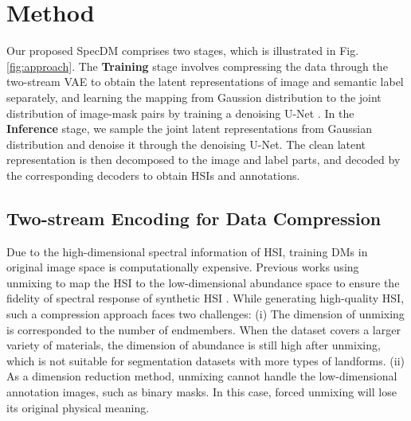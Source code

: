 \section{Method}
\label{sec:method}

Our proposed SpecDM comprises two stages, which is illustrated in Fig. \ref{fig:approach}. The \textbf{Training} stage involves compressing the data through the two-stream VAE to obtain the latent representations of image and semantic label separately, and learning the mapping from Gaussion distribution to the joint distribution of image-mask pairs by training a denoising U-Net \cite{unet}. In the \textbf{Inference} stage, we sample the joint latent representations from Gaussian distribution and denoise it through the denoising U-Net. The clean latent representation is then decomposed to the image and label parts, and decoded by the corresponding decoders to obtain HSIs and annotations.

\subsection{Two-stream Encoding for Data Compression}

Due to the high-dimensional spectral information of HSI, training DMs in original image space is computationally expensive. Previous works using unmixing to map the HSI to the low-dimensional abundance space to ensure the fidelity of spectral response of synthetic HSI \cite{yu2024unmixdiff, yu2024unmixing}. While generating high-quality HSI, such a compression approach faces two challenges: (i) The dimension of unmixing is corresponded to the number of endmembers. When the dataset covers a larger variety of materials, the dimension of abundance is still high after unmixing, which is not suitable for segmentation datasets with more types of landforms. (ii) As a dimension reduction method, unmixing cannot handle the low-dimensional annotation images, such as binary masks. In this case, forced unmixing will lose its original physical meaning.

